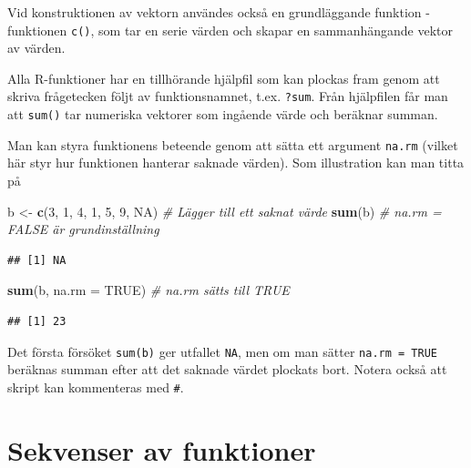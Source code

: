 \documentclass[
]{book}
\newenvironment{Shaded}{\begin{snugshade}}{\end{snugshade}}
\newcommand{\AttributeTok}[1]{\textcolor[rgb]{0.13,0.29,0.53}{#1}}
\newcommand{\CommentTok}[1]{\textcolor[rgb]{0.56,0.35,0.01}{\textit{#1}}}
\newcommand{\ConstantTok}[1]{\textcolor[rgb]{0.56,0.35,0.01}{#1}}
\newcommand{\DecValTok}[1]{\textcolor[rgb]{0.00,0.00,0.81}{#1}}
\newcommand{\FunctionTok}[1]{\textcolor[rgb]{0.13,0.29,0.53}{\textbf{#1}}}
\newcommand{\NormalTok}[1]{#1}
\newcommand{\OtherTok}[1]{\textcolor[rgb]{0.56,0.35,0.01}{#1}}
\theoremstyle{definition}
\theoremstyle{definition}
\theoremstyle{definition}
\theoremstyle{definition}
\theoremstyle{remark}
\begin{document}
Vid konstruktionen av vektorn användes också en grundläggande funktion - funktionen \texttt{c()}, som tar en serie värden och skapar en sammanhängande vektor av värden.

Alla R-funktioner har en tillhörande hjälpfil som kan plockas fram genom att skriva frågetecken följt av funktionsnamnet, t.ex. \texttt{?sum}. Från hjälpfilen får man att \texttt{sum()} tar numeriska vektorer som ingående värde och beräknar summan.

Man kan styra funktionens beteende genom att sätta ett argument \texttt{na.rm} (vilket här styr hur funktionen hanterar saknade värden). Som illustration kan man titta på

\begin{Shaded}
\begin{Highlighting}[]
\NormalTok{b }\OtherTok{\textless{}{-}} \FunctionTok{c}\NormalTok{(}\DecValTok{3}\NormalTok{, }\DecValTok{1}\NormalTok{, }\DecValTok{4}\NormalTok{, }\DecValTok{1}\NormalTok{, }\DecValTok{5}\NormalTok{, }\DecValTok{9}\NormalTok{, }\ConstantTok{NA}\NormalTok{)  }\CommentTok{\# Lägger till ett saknat värde}
\FunctionTok{sum}\NormalTok{(b)                        }\CommentTok{\# na.rm = FALSE är grundinställning}
\end{Highlighting}
\end{Shaded}

\begin{verbatim}
## [1] NA
\end{verbatim}

\begin{Shaded}
\begin{Highlighting}[]
\FunctionTok{sum}\NormalTok{(b, }\AttributeTok{na.rm =} \ConstantTok{TRUE}\NormalTok{)          }\CommentTok{\# na.rm sätts till TRUE}
\end{Highlighting}
\end{Shaded}

\begin{verbatim}
## [1] 23
\end{verbatim}

Det första försöket \texttt{sum(b)} ger utfallet \texttt{NA}, men om man sätter \texttt{na.rm\ =\ TRUE} beräknas summan efter att det saknade värdet plockats bort. Notera också att skript kan kommenteras med \texttt{\#}.

\section{Sekvenser av funktioner}\label{sekvenser-av-funktioner}
\end{document}
